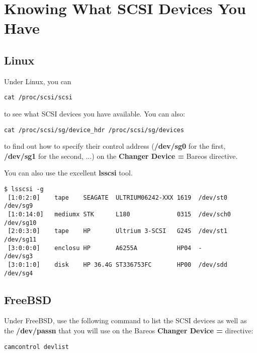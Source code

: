 \section{Knowing What SCSI Devices You Have}
\label{SCSI devices}

\subsection{Linux}
Under Linux, you can

\footnotesize
\begin{verbatim}
cat /proc/scsi/scsi
\end{verbatim}
\normalsize

to see what SCSI devices you have available. You can also:

\footnotesize
\begin{verbatim}
cat /proc/scsi/sg/device_hdr /proc/scsi/sg/devices
\end{verbatim}
\normalsize

to find out how to specify their control address ({\bf /dev/sg0} for the
first, {\bf /dev/sg1} for the second, ...) on the {\bf Changer Device = }
Bareos directive.

You can also use the excellent  {\bf lsscsi} tool.
\footnotesize
\begin{verbatim}
$ lsscsi -g
 [1:0:2:0]    tape    SEAGATE  ULTRIUM06242-XXX 1619  /dev/st0  /dev/sg9
 [1:0:14:0]   mediumx STK      L180             0315  /dev/sch0 /dev/sg10
 [2:0:3:0]    tape    HP       Ultrium 3-SCSI   G24S  /dev/st1  /dev/sg11
 [3:0:0:0]    enclosu HP       A6255A           HP04  -         /dev/sg3
 [3:0:1:0]    disk    HP 36.4G ST336753FC       HP00  /dev/sdd  /dev/sg4
\end{verbatim}
\normalsize


\subsection{FreeBSD}
Under FreeBSD, use the following command to list the SCSI devices as well as the {\bf /dev/passn} that you will use on
the Bareos {\bf Changer Device = } directive:


\footnotesize
\begin{verbatim}
camcontrol devlist
\end{verbatim}
\normalsize

